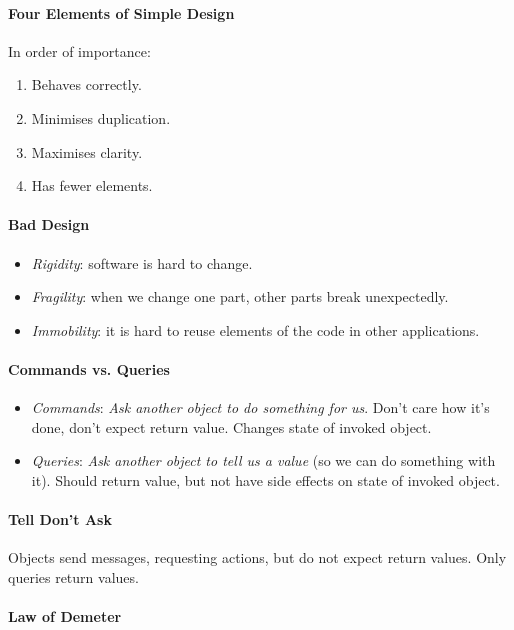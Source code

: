 \documentclass[twocolumn,english]{article}
\begin{document}
\paragraph{Four Elements of Simple Design}

In order of importance:
\begin{enumerate}
\item Behaves correctly.
\item Minimises duplication.
\item Maximises clarity.
\item Has fewer elements.
\end{enumerate}

\paragraph{Bad Design}
\begin{itemize}
\item \emph{Rigidity}: software is hard to change.
\item \emph{Fragility}: when we change one part, other parts break unexpectedly.
\item \emph{Immobility}: it is hard to reuse elements of the code in other
applications.
\end{itemize}

\paragraph{Commands vs. Queries}
\begin{itemize}
\item \emph{Commands}:\emph{ Ask another object to do something for us}.
Don't care how it's done, don't expect return value. Changes state
of invoked object.
\item \emph{Queries}:\emph{ Ask another object to tell us a value} (so we
can do something with it). Should return value, but not have side
effects on state of invoked object.
\end{itemize}

\paragraph{Tell Don't Ask}

Objects send messages, requesting actions, but do not expect return
values. Only queries return values.

\paragraph{Law of Demeter}
\end{document}
